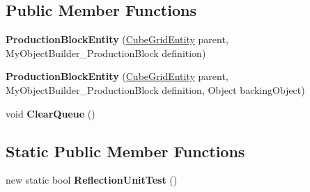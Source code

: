 \subsection*{Public Member Functions}
\begin{DoxyCompactItemize}
\item 
\hypertarget{class_s_e_mod_a_p_i_internal_1_1_a_p_i_1_1_entity_1_1_sector_1_1_sector_object_1_1_cube_grid_1_1ad6cba65b35b2f15d0fc9a7c92190a4b_a57ae22cbb97c1f7630922544c2f191ee}{}{\bfseries Production\+Block\+Entity} (\hyperlink{class_s_e_mod_a_p_i_internal_1_1_a_p_i_1_1_entity_1_1_sector_1_1_sector_object_1_1_cube_grid_entity}{Cube\+Grid\+Entity} parent, My\+Object\+Builder\+\_\+\+Production\+Block definition)\label{class_s_e_mod_a_p_i_internal_1_1_a_p_i_1_1_entity_1_1_sector_1_1_sector_object_1_1_cube_grid_1_1ad6cba65b35b2f15d0fc9a7c92190a4b_a57ae22cbb97c1f7630922544c2f191ee}

\item 
\hypertarget{class_s_e_mod_a_p_i_internal_1_1_a_p_i_1_1_entity_1_1_sector_1_1_sector_object_1_1_cube_grid_1_1ad6cba65b35b2f15d0fc9a7c92190a4b_a5f93b345e956e29f48c4fd97fb13015a}{}{\bfseries Production\+Block\+Entity} (\hyperlink{class_s_e_mod_a_p_i_internal_1_1_a_p_i_1_1_entity_1_1_sector_1_1_sector_object_1_1_cube_grid_entity}{Cube\+Grid\+Entity} parent, My\+Object\+Builder\+\_\+\+Production\+Block definition, Object backing\+Object)\label{class_s_e_mod_a_p_i_internal_1_1_a_p_i_1_1_entity_1_1_sector_1_1_sector_object_1_1_cube_grid_1_1ad6cba65b35b2f15d0fc9a7c92190a4b_a5f93b345e956e29f48c4fd97fb13015a}

\item 
\hypertarget{class_s_e_mod_a_p_i_internal_1_1_a_p_i_1_1_entity_1_1_sector_1_1_sector_object_1_1_cube_grid_1_1ad6cba65b35b2f15d0fc9a7c92190a4b_af535ef4a0ef4c5b4e3e609b1ef7408e6}{}void {\bfseries Clear\+Queue} ()\label{class_s_e_mod_a_p_i_internal_1_1_a_p_i_1_1_entity_1_1_sector_1_1_sector_object_1_1_cube_grid_1_1ad6cba65b35b2f15d0fc9a7c92190a4b_af535ef4a0ef4c5b4e3e609b1ef7408e6}

\end{DoxyCompactItemize}
\subsection*{Static Public Member Functions}
\begin{DoxyCompactItemize}
\item 
\hypertarget{class_s_e_mod_a_p_i_internal_1_1_a_p_i_1_1_entity_1_1_sector_1_1_sector_object_1_1_cube_grid_1_1ad6cba65b35b2f15d0fc9a7c92190a4b_a30bc50bbe6ca26d98e2435bbaf2dfe31}{}new static bool {\bfseries Reflection\+Unit\+Test} ()\label{class_s_e_mod_a_p_i_internal_1_1_a_p_i_1_1_entity_1_1_sector_1_1_sector_object_1_1_cube_grid_1_1ad6cba65b35b2f15d0fc9a7c92190a4b_a30bc50bbe6ca26d98e2435bbaf2dfe31}

\end{DoxyCompactItemize}
